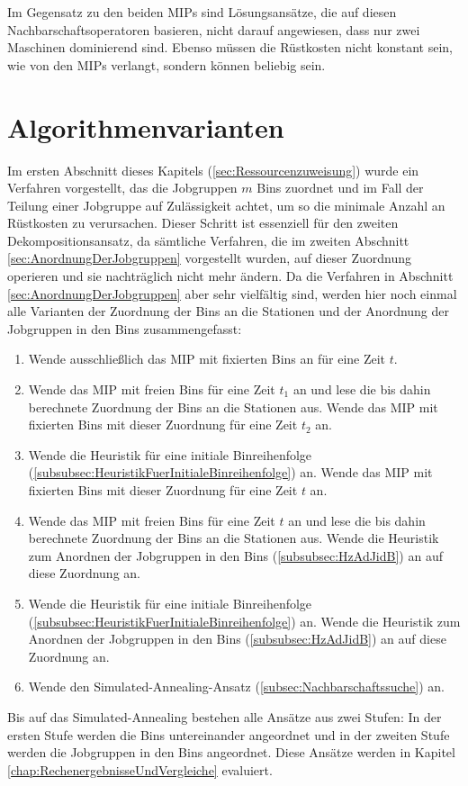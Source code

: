 \documentclass{scrreprt}
\begin{document}
Im Gegensatz zu den beiden MIPs sind Lösungsansätze, die auf diesen Nachbarschaftsoperatoren basieren, nicht darauf angewiesen, 
dass nur zwei Maschinen dominierend sind. Ebenso müssen die Rüstkosten nicht konstant sein, wie von den MIPs verlangt, sondern können beliebig sein.


\section{Algorithmenvarianten}
\label{sec:Algorithmenvarianten}
Im ersten Abschnitt dieses Kapitels (\ref{sec:Ressourcenzuweisung}) wurde ein Verfahren vorgestellt, 
das die Jobgruppen $m$ Bins zuordnet und im Fall der Teilung einer Jobgruppe auf Zulässigkeit achtet,
um so die minimale Anzahl an Rüstkosten zu verursachen.
Dieser Schritt ist essenziell für den zweiten Dekompositionsansatz, da sämtliche Verfahren, die im zweiten Abschnitt \ref{sec:AnordnungDerJobgruppen} vorgestellt wurden,
auf dieser Zuordnung operieren und sie nachträglich nicht mehr ändern.
Da die Verfahren in Abschnitt \ref{sec:AnordnungDerJobgruppen} aber sehr vielfältig sind, 
werden hier noch einmal alle Varianten der Zuordnung der Bins an die Stationen und der Anordnung der Jobgruppen in den Bins zusammengefasst:
\begin{enumerate}
    \item Wende ausschließlich das MIP mit fixierten Bins an für eine Zeit $t$.%
    \item Wende das MIP mit freien Bins für eine Zeit $t_1$ an und lese die bis dahin berechnete Zuordnung der Bins an die Stationen aus.
        Wende das MIP mit fixierten Bins mit dieser Zuordnung für eine Zeit $t_2$ an.
    \item Wende die Heuristik für eine initiale Binreihenfolge (\ref{subsubsec:HeuristikFuerInitialeBinreihenfolge}) an.
        Wende das MIP mit fixierten Bins mit dieser Zuordnung für eine Zeit $t$ an.
    \item Wende das MIP mit freien Bins für eine Zeit $t$ an und lese die bis dahin berechnete Zuordnung der Bins an die Stationen aus.
        Wende die Heuristik zum Anordnen der Jobgruppen in den Bins (\ref{subsubsec:HzAdJidB}) an auf diese Zuordnung an.
    \item Wende die Heuristik für eine initiale Binreihenfolge (\ref{subsubsec:HeuristikFuerInitialeBinreihenfolge}) an.
        Wende die Heuristik zum Anordnen der Jobgruppen in den Bins (\ref{subsubsec:HzAdJidB}) an auf diese Zuordnung an.
    \item Wende den Simulated-Annealing-Ansatz (\ref{subsec:Nachbarschaftssuche}) an.
\end{enumerate}
Bis auf das Simulated-Annealing bestehen alle Ansätze aus zwei Stufen: 
In der ersten Stufe werden die Bins untereinander angeordnet und in der zweiten Stufe werden die Jobgruppen in den Bins angeordnet.
Diese Ansätze werden in Kapitel \ref{chap:RechenergebnisseUndVergleiche} evaluiert.
\end{document}
